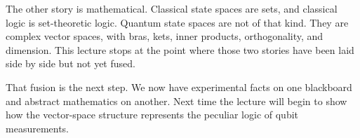 The other story is mathematical. Classical state spaces are sets, and classical logic is set-theoretic logic. Quantum state spaces are not of that kind. They are complex vector spaces, with bras, kets, inner products, orthogonality, and dimension. This lecture stops at the point where those two stories have been laid side by side but not yet fused.

That fusion is the next step. We now have experimental facts on one blackboard and abstract mathematics on another. Next time the lecture will begin to show how the vector-space structure represents the peculiar logic of qubit measurements.